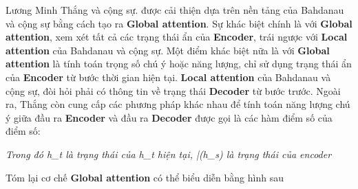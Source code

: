 Lương Minh Thắng và cộng sự. được cải thiện dựa trên nền tảng của Bahdanau và cộng sự bằng cách tạo ra \textbf{Global
attention}. Sự khác biệt chính là với \textbf{Global attention}, xem xét tất cả các trạng thái ẩn của
\textbf{Encoder}, trái ngược với \textbf{Local attention} của Bahdanau và cộng sự. Một điểm khác biệt nữa là với
\textbf{Global attention} là tính toán trọng số chú ý hoặc năng lượng, chỉ sử dụng trạng thái ẩn của
\textbf{Encoder} từ bước thời gian hiện tại. \textbf{Local attention} của Bahdanau và cộng sự, đòi hỏi phải có thông
tin về trạng thái \textbf{Decoder} từ bước trước. Ngoài ra, Thắng còn cung cấp các phương pháp khác nhau để tính
toán năng lượng chú ý giữa đầu ra \textbf{Encoder} và đầu ra \textbf{Decoder}  được gọi là các hàm điểm số của điểm số:
\begin{figure}[!htb]
\end{figure}
\textit{Trong đó h_t là trạng thái của h_t hiện tại, \bar(h_s) là trạng thái của encoder}

Tóm lại cơ chế \textbf{Global attention} có thể biểu diễn bằng hình sau
\begin{figure}[!htb]
\end{figure}